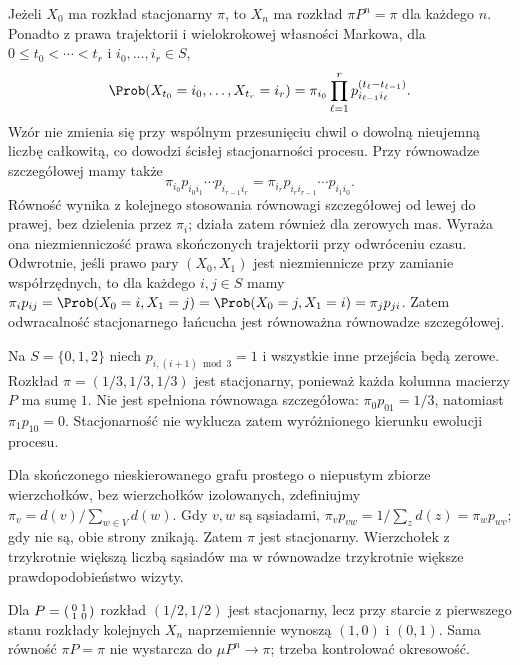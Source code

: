 Jeżeli $X_0$ ma rozkład stacjonarny $\pi$, to
$X_n$ ma rozkład $\pi P^n=\pi$ dla każdego $n$.
Ponadto z prawa trajektorii i wielokrokowej
własności Markowa, dla $0\leq t_0<\cdots<t_r$
i $i_0,\ldots,i_r\in S$,
\[
\Prob(X_{t_0}=i_0,\ldots,X_{t_r}=i_r)
=\pi_{i_0}\prod_{\ell=1}^r
p_{i_{\ell-1}i_\ell}^{(t_\ell-t_{\ell-1})}.
\]
Wzór nie zmienia się przy wspólnym przesunięciu
chwil o dowolną nieujemną liczbę całkowitą,
co dowodzi ścisłej stacjonarności procesu.
Przy równowadze szczegółowej mamy także
\[
\pi_{i_0}p_{i_0i_1}\cdots p_{i_{r-1}i_r}
=\pi_{i_r}p_{i_ri_{r-1}}\cdots p_{i_1i_0}.
\]
Równość wynika z kolejnego stosowania równowagi
szczegółowej od lewej do prawej, bez dzielenia
przez $\pi_i$; działa zatem również dla zerowych mas.
Wyraża ona niezmienniczość prawa skończonych
trajektorii przy odwróceniu czasu. Odwrotnie, jeśli
prawo pary $(X_0,X_1)$ jest niezmiennicze przy
zamianie współrzędnych, to dla każdego $i,j\in S$
mamy $\pi_i p_{ij}=\Prob(X_0=i,X_1=j)
=\Prob(X_0=j,X_1=i)=\pi_jp_{ji}$.
Zatem odwracalność stacjonarnego łańcucha jest
równoważna równowadze szczegółowej.

\begin{przyklad}
Na $S=\{0,1,2\}$ niech $p_{i,(i+1)\bmod3}=1$
i wszystkie inne przejścia będą zerowe. Rozkład
$\pi=(1/3,1/3,1/3)$ jest stacjonarny, ponieważ
każda kolumna macierzy $P$ ma sumę $1$.
Nie jest spełniona równowaga szczegółowa:
$\pi_0p_{01}=1/3$, natomiast $\pi_1p_{10}=0$.
Stacjonarność nie wyklucza zatem wyróżnionego
kierunku ewolucji procesu.
\end{przyklad}

\begin{przyklad}
Dla skończonego nieskierowanego grafu prostego
o niepustym zbiorze wierzchołków, bez wierzchołków
izolowanych, zdefiniujmy
$\pi_v=d(v)/\sum_{w\in V}d(w)$.
Gdy $v,w$ są sąsiadami,
$\pi_vp_{vw}=1/\sum_zd(z)=\pi_wp_{wv}$;
gdy nie są, obie strony znikają. Zatem $\pi$
jest stacjonarny. Wierzchołek z trzykrotnie
większą liczbą sąsiadów ma w równowadze
trzykrotnie większe prawdopodobieństwo wizyty.
\end{przyklad}

\begin{przyklad}
Dla $P=\begin{psmallmatrix}0&1\\1&0\end{psmallmatrix}$
rozkład $(1/2,1/2)$ jest stacjonarny, lecz
przy starcie z pierwszego stanu rozkłady
kolejnych $X_n$ naprzemiennie wynoszą
$(1,0)$ i $(0,1)$.
Sama równość $\pi P=\pi$ nie wystarcza do
$\mu P^n\to\pi$; trzeba kontrolować okresowość.
\end{przyklad}

